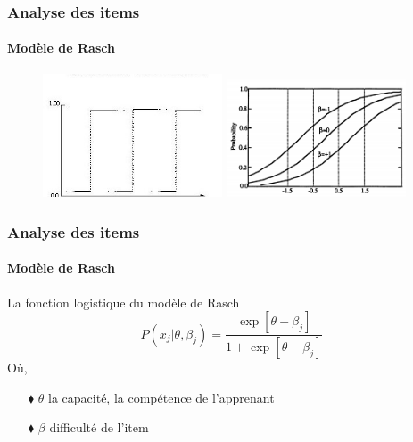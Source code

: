 \documentclass[aspectratio=169,professionalfonts, 12pt]{beamer}
\begin{document}
\begin{frame}
  \frametitle{Analyse des items}
  \framesubtitle{Modèle de Rasch}
  \justifying 
  \begin{minipage}{\textwidth}
    \begin{figure}
      \includegraphics[width=0.475\textwidth]{images/etat_art/guttman_model.jpg}
      \hfill
      \includegraphics[width=0.475\textwidth]{images/etat_art/rasch_model.png}
   \end{figure}
  \end{minipage} 
\end{frame}

\begin{frame}
  \frametitle{Analyse des items}
  \framesubtitle{Modèle de Rasch}
  \justifying 
  \begin{minipage}{\textwidth}
  \begin{block}{La fonction logistique du modèle de Rasch}
  \begin{equation}P(x_{j}| \theta, \beta_{j}) = \frac{\exp \left[\theta - \beta_{j} \right]  }{1+ \exp \left[ \theta - \beta_{j} \right] }
  \end{equation}
  Où, \\
  \begin{itemize}
    \item[$\blacklozenge$] \(\displaystyle \theta \) la capacité, la compétence de l'apprenant 
    \item[$\blacklozenge$] \(\displaystyle \beta \) difficulté de l'item
  \end{itemize}
  \end{block}  
  \end{minipage} 
\end{frame}
\end{document}
